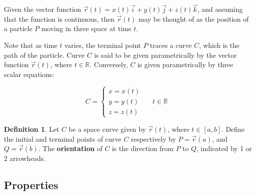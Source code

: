 \documentclass[11pt]{article}
\theoremstyle{plain} %
\theoremstyle{definition}
\newtheorem*{definition}{Definition} %
\theoremstyle{example}
\theoremstyle{remark}
\begin{document}
Given the vector function $\vec{r}(t)  = x(t)\vec{i} + y(t)\vec{j} + z(t)\vec{k}$, and assuming that the function is continuous, then $\vec{r}(t)$ may be thought of as the position of a particle $P$ moving in three space at time $t$.

Note that as time $t$ varies, the terminal point $P$ traces a curve $C$, which is the path of the particle. Curve $C$ is said to be given parametrically by the vector function $\vec{r}(t)$, where $t \in \mathbb R$. Conversely, $C$ is given parametrically by three scalar equations:


\[ C = \begin{cases}
    x = x (t)     & \quad \\
    y = y(t)  & \quad t \in \mathbb R\\
    z = z(t) & \quad
  \end{cases}
\]



\bigskip
\begin{definition}
Let $C$ be a space curve given by $\vec{r}(t)$, where $t \in [a, b]$. Define the initial and terminal points of curve $C$ respectively by $P = \vec{r}(a)$, and $Q = \vec{r}(b)$. The \textbf{orientation} of $C$ is the direction from $P$ to $Q$, indicated by 1 or 2 arrowheads.
\end{definition}

\subsection{Properties}
\end{document}
